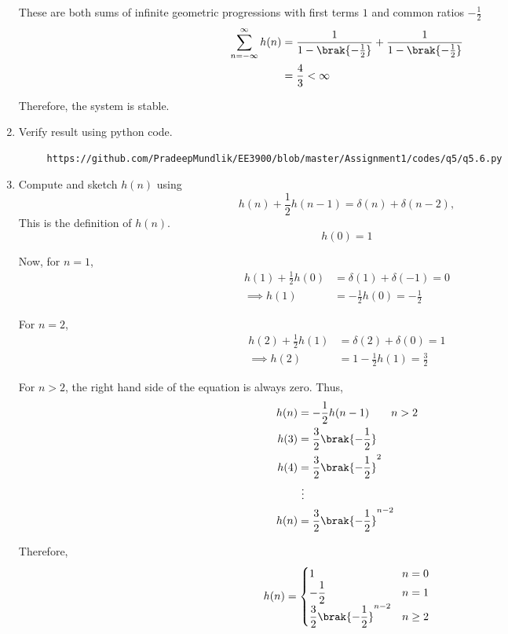 \documentclass[journal,12pt,twocolumn]{IEEEtran}
\renewcommand\thesection{\arabic{section}}
\begin{document}
\begin{enumerate}[label=\thesection.\arabic*]
These are both sums of infinite geometric progressions with first terms $1$ and common ratios $-\frac12$
\begin{align}
     \sum_{n=-\infty}^{\infty}h(n) &= \frac{1}{1 - \brak{-\frac12}} + \frac{1}{1 - \brak{-\frac12}} \\
     &= \frac{4}{3} < \infty
\end{align}

Therefore, the system is stable.
\item Verify result using python code.\\
\solution 
\begin{lstlisting}
     https://github.com/PradeepMundlik/EE3900/blob/master/Assignment1/codes/q5/q5.6.py

\end{lstlisting}
\item 
Compute and sketch $h(n)$ using 
\begin{equation}
\label{eq:iir_filter_h}
h(n) + \frac{1}{2}h(n-1) = \delta(n) + \delta(n-2), 
\end{equation}
%
This is the definition of $h(n)$.
\\
\solution 
\begin{equation}
     h(0) = 1
\end{equation}

Now, for $n = 1$,
\begin{align}
     h(1) + \frac12 h(0) &= \delta(1) + \delta(-1) = 0 \\
     \implies h(1) &= - \frac{1}{2} h(0) = -\frac{1}{2}
\end{align}

For $n = 2$,
\begin{align}
     h(2) + \frac12 h(1) &= \delta(2) + \delta(0) = 1 \\
     \implies h(2) &= 1 - \frac{1}{2} h(1) = \frac{3}{2}
\end{align}

For $n > 2$, the right hand side of the equation is always zero. Thus,
\begin{align}
     h(n) &= -\frac{1}{2} h(n-1) \qquad n > 2 \\
     h(3) &= \frac{3}{2} \brak{-\frac12} \\
     h(4) &= \frac{3}{2} \brak{-\frac12}^2 \\
     &~\vdots \\
     h(n) &= \frac{3}{2} \brak{-\frac12}^{n-2}
\end{align}

Therefore,
\begin{align}
     h(n) = 
     \begin{cases}
          1 & n = 0 \\
          -\dfrac{1}{2} & n = 1 \\
          \dfrac{3}{2} \brak{-\dfrac12}^{n-2} & n \ge 2
     \end{cases}
\end{align}


\end{enumerate}
\end{document}
